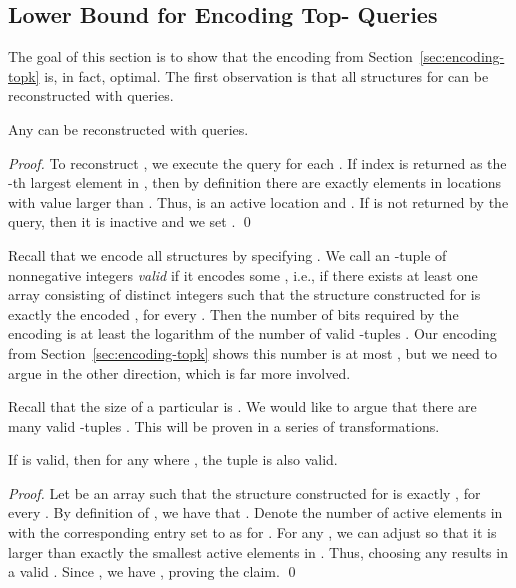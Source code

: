 \documentclass[runningheads]{llncs}
\begin{document}
\subsection{Lower Bound for Encoding Top-\texorpdfstring{}{k} Queries}

The goal of this section is to show that the encoding from
Section~\ref{sec:encoding-topk} is, in fact, optimal. The first
observation is that all structures  for  can be
reconstructed with  queries.

\begin{lemma}
\label{lem:reconstruction-topk}
Any  can be reconstructed with  queries.
\end{lemma}

\begin{proof}
To reconstruct , we execute the query  for
each .  If index  is returned as the -th
largest element in , then by definition there are exactly
 elements in locations  with value larger than
.  Thus,  is an active location and .  If  is not returned by the query, then it is inactive
and we set .  \qed
\end{proof}

Recall that we encode all structures by specifying
.  We call an -tuple
of nonnegative integers 
\emph{valid} if it encodes some , i.e.,
if there exists at least one array  consisting of distinct
integers such that the structure constructed for  is exactly
the encoded , for every . Then the number of
bits required by the encoding is at least the logarithm of the number
of valid -tuples
. Our encoding from
Section~\ref{sec:encoding-topk} shows this number is at most
, but we need to argue in the other direction,
which is far more involved.

Recall that the size of a particular  is .  We would like to argue that there are many
valid -tuples .  This
will be proven in a series of transformations.

\begin{lemma}
\label{lem:valid-tuple-topk}
If  is valid, then for
any 
where , the tuple
 is also
valid.
\end{lemma}


\begin{proof}
Let  be an array such that the structure constructed for
 is exactly , for every . By
definition of , we have that .  Denote the number of
active elements in  with the corresponding entry set to
 as  for . For any , we can adjust
 so that it is larger than exactly the  smallest active
elements in . Thus, choosing any  results in a valid
.  Since , we have , proving the claim.  \qed
\end{proof}
\end{document}
